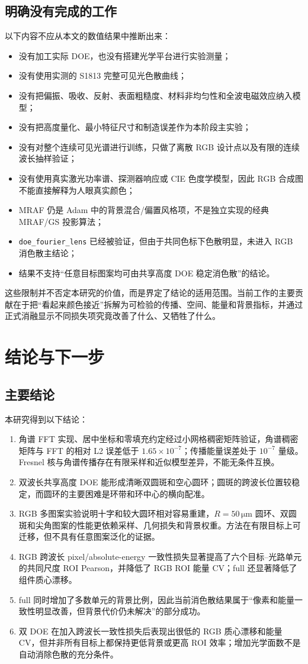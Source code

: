 \documentclass[UTF8,a4paper,12pt]{ctexart}
\newcommand{\um}{\si{\micro\meter}}
\begin{document}
\subsection{明确没有完成的工作}
以下内容不应从本文的数值结果中推断出来：
\begin{itemize}
\item 没有加工实际 DOE，也没有搭建光学平台进行实验测量；
\item 没有使用实测的 S1813 完整可见光色散曲线；
\item 没有把偏振、吸收、反射、表面粗糙度、材料非均匀性和全波电磁效应纳入模型；
\item 没有把高度量化、最小特征尺寸和制造误差作为本阶段主实验；
\item 没有对整个连续可见光谱进行训练，只做了离散 RGB 设计点以及有限的连续波长抽样验证；
\item 没有使用真实激光功率谱、探测器响应或 CIE 色度学模型，因此 RGB 合成图不能直接解释为人眼真实颜色；
\item MRAF 仍是 Adam 中的背景混合/偏置风格项，不是独立实现的经典 MRAF/GS 投影算法；
\item \texttt{doe\_fourier\_lens} 已经被验证，但由于共同色标下色散明显，未进入 RGB 消色散主结论；
\item 结果不支持“任意目标图案均可由共享高度 DOE 稳定消色散”的结论。
\end{itemize}
这些限制并不否定本研究的价值，而是界定了结论的适用范围。当前工作的主要贡献在于把“看起来颜色接近”拆解为可检验的传播、空间、能量和背景指标，并通过正式消融显示不同损失项究竟改善了什么、又牺牲了什么。

\section{结论与下一步}
\subsection{主要结论}
本研究得到以下结论：
\begin{enumerate}
\item 角谱 FFT 实现、居中坐标和零填充约定经过小网格稠密矩阵验证，角谱稠密矩阵与 FFT 的相对 L2 误差低于 $1.65\times10^{-7}$；传播能量误差处于 $10^{-7}$ 量级。Fresnel 核与角谱传播存在有限采样和近似模型差异，不能无条件互换。
\item 双波长共享高度 DOE 能形成清晰双圆斑和空心圆环；圆斑的跨波长位置较稳定，而圆环的主要困难是环带和环中心的横向配准。
\item RGB 多图案实验说明十字和较大圆环相对容易重建，$R=50\,\um$ 圆环、双圆斑和尖角图案的性能更依赖采样、几何损失和背景权重。方法在有限目标上可迁移，但不具有任意图案泛化的证据。
\item RGB 跨波长 pixel/absolute-energy 一致性损失显著提高了六个目标--光路单元的共同尺度 ROI Pearson，并降低了 RGB ROI 能量 CV；full 还显著降低了组件质心漂移。
\item full 同时增加了多数单元的背景比例，因此当前消色散结果属于“像素和能量一致性明显改善，但背景代价仍未解决”的部分成功。
\item 双 DOE 在加入跨波长一致性损失后表现出很低的 RGB 质心漂移和能量 CV，但并非所有目标上都保持更低背景或更高 ROI 效率；增加光学面数不是自动消除色散的充分条件。
\end{enumerate}
\end{document}
